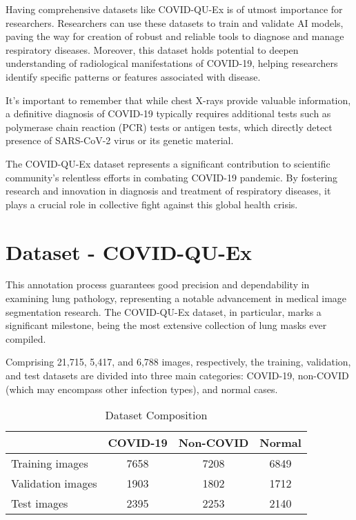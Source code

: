 \documentclass{article}
\begin{document}
Having comprehensive datasets like COVID-QU-Ex is of utmost importance for researchers. Researchers can use these datasets to train and validate AI models, paving the way for creation of robust and reliable tools to diagnose and manage respiratory diseases. Moreover, this dataset holds potential to deepen understanding of radiological manifestations of COVID-19, helping researchers identify specific patterns or features associated with disease.

It's important to remember that while chest X-rays provide valuable information, a definitive diagnosis of COVID-19 typically requires additional tests such as polymerase chain reaction (PCR) tests or antigen tests, which directly detect presence of SARS-CoV-2 virus or its genetic material.

The COVID-QU-Ex dataset represents a significant contribution to scientific community's relentless efforts in combating COVID-19 pandemic. By fostering research and innovation in diagnosis and treatment of respiratory diseases, it plays a crucial role in collective fight against this global health crisis.

\section{Dataset - COVID-QU-Ex}
This annotation process guarantees good precision and dependability in examining lung pathology, representing a notable advancement in medical image segmentation research. The COVID-QU-Ex dataset, in particular, marks a significant milestone, being the most extensive collection of lung masks ever compiled.

Comprising 21,715, 5,417, and 6,788 images, respectively, the training, validation, and test datasets are divided into three main categories: COVID-19, non-COVID (which may encompass other infection types), and normal cases.
\begin{table}[htbp]
    \centering
    \caption{Dataset Composition}
    \begin{tabular}{lccc}
        \toprule
        & \textbf{COVID-19} & \textbf{Non-COVID} & \textbf{Normal} \\
        \midrule
        Training images & 7658 & 7208 & 6849 \\
        Validation images & 1903 & 1802 & 1712 \\
        Test images & 2395 & 2253 & 2140 \\
        \bottomrule
    \end{tabular}
\end{table}
\end{document}
